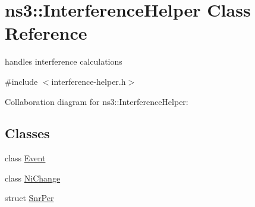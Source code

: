 \hypertarget{classns3_1_1InterferenceHelper}{}\section{ns3\+:\+:Interference\+Helper Class Reference}
\label{classns3_1_1InterferenceHelper}


handles interference calculations  




{\ttfamily \#include $<$interference-\/helper.\+h$>$}



Collaboration diagram for ns3\+:\+:Interference\+Helper\+:
\subsection*{Classes}
\begin{DoxyCompactItemize}
\item 
class \hyperlink{classns3_1_1InterferenceHelper_1_1Event}{Event}
\item 
class \hyperlink{classns3_1_1InterferenceHelper_1_1NiChange}{Ni\+Change}
\item 
struct \hyperlink{structns3_1_1InterferenceHelper_1_1SnrPer}{Snr\+Per}
\end{DoxyCompactItemize}
